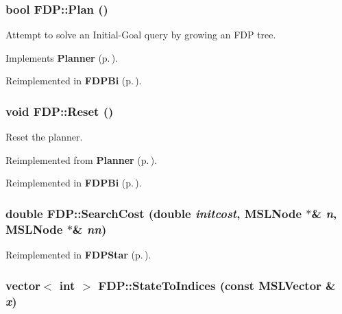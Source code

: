 \subsubsection{\setlength{\rightskip}{0pt plus 5cm}bool FDP::Plan ()\hspace{0.3cm}{\tt  [virtual]}}\label{classFDP_a3}


Attempt to solve an Initial-Goal query by growing an FDP tree.



Implements {\bf Planner} {\rm (p.\,\pageref{classPlanner_a4})}.

Reimplemented in {\bf FDPBi} {\rm (p.\,\pageref{classFDPBi_a3})}.
\subsubsection{\setlength{\rightskip}{0pt plus 5cm}void FDP::Reset ()\hspace{0.3cm}{\tt  [virtual]}}\label{classFDP_a2}


Reset the planner.



Reimplemented from {\bf Planner} {\rm (p.\,\pageref{classPlanner_a2})}.

Reimplemented in {\bf FDPBi} {\rm (p.\,\pageref{classFDPBi_a2})}.
\subsubsection{\setlength{\rightskip}{0pt plus 5cm}double FDP::Search\-Cost (double {\em initcost}, {\bf MSLNode} $\ast$\& {\em n}, {\bf MSLNode} $\ast$\& {\em nn})\hspace{0.3cm}{\tt  [protected, virtual]}}\label{classFDP_b0}




Reimplemented in {\bf FDPStar} {\rm (p.\,\pageref{classFDPStar_b0})}.
\subsubsection{\setlength{\rightskip}{0pt plus 5cm}vector$<$ int $>$ FDP::State\-To\-Indices (const {\bf MSLVector} \& {\em x})\hspace{0.3cm}{\tt  [protected, virtual]}}\label{classFDP_b1}




